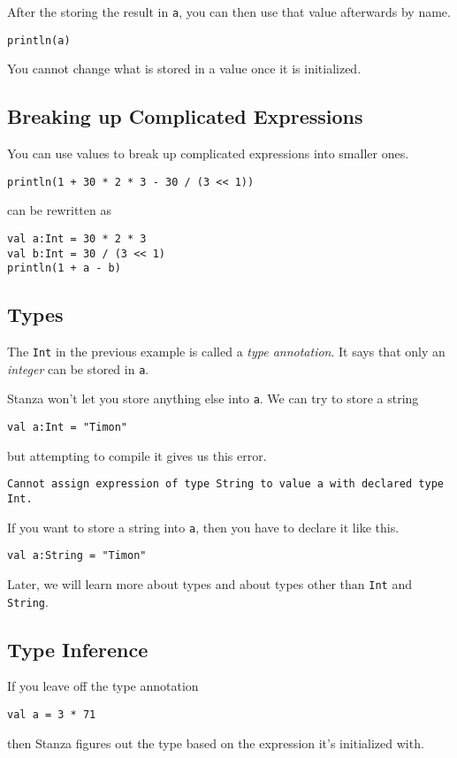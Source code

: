 \documentclass[10pt,oneside]{book}
\begin{document}
After the storing the result in \texttt{\frenchspacing a}, you can then use that value afterwards by name.
\begin{lstlisting}
println(a)
\end{lstlisting}

You cannot change what is stored in a value once it is initialized. 

\subsection*{Breaking up Complicated Expressions}

You can use values to break up complicated expressions into smaller ones.
\begin{lstlisting}
println(1 + 30 * 2 * 3 - 30 / (3 << 1))
\end{lstlisting}
can be rewritten as
\begin{lstlisting}
val a:Int = 30 * 2 * 3
val b:Int = 30 / (3 << 1)
println(1 + a - b)
\end{lstlisting}

\subsection*{Types}
The \texttt{\frenchspacing Int} in the previous example is called a {\em type annotation}. It says that only an {\em integer} can be stored in \texttt{\frenchspacing a}. 

Stanza won't let you store anything else into \texttt{\frenchspacing a}. We can try to store a string
\begin{lstlisting}
val a:Int = "Timon"
\end{lstlisting}
but attempting to compile it gives us this error.
\begin{lstlisting}
Cannot assign expression of type String to value a with declared type Int.
\end{lstlisting}

If you want to store a string into \texttt{\frenchspacing a}, then you have to declare it like this.
\begin{lstlisting}
val a:String = "Timon"
\end{lstlisting}

Later, we will learn more about types and about types other than \texttt{\frenchspacing Int} and \texttt{\frenchspacing String}. 

\subsection*{Type Inference}
If you leave off the type annotation
\begin{lstlisting}
val a = 3 * 71
\end{lstlisting}
then Stanza figures out the type based on the expression it's initialized with.
\end{document}

